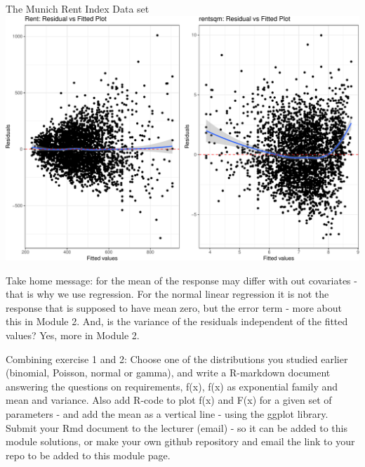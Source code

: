 \documentclass[
  ignorenonframetext,
]{beamer}
\begin{document}
\begin{frame}[fragile]
\begin{block}{The Munich Rent Index Data set}
\includegraphics{Module01IntroPresentation_files/figure-beamer/unnamed-chunk-7-1.pdf}

Take home message: for the mean of the response may differ with out
covariates - that is why we use regression. For the normal linear
regression it is not the response that is supposed to have mean zero,
but the error term - more about this in Module 2. And, is the variance
of the residuals independent of the fitted values? Yes, more in Module
2.
\end{block}
\end{frame}

\begin{frame}
\begin{block}{Combining exercise 1 and 2:}
\protect\hypertarget{combining-exercise-1-and-2}{}
Choose one of the distributions you studied earlier (binomial, Poisson,
normal or gamma), and write a R-markdown document answering the
questions on requirements, f(x), f(x) as exponential family and mean and
variance. Also add R-code to plot f(x) and F(x) for a given set of
parameters - and add the mean as a vertical line - using the ggplot
library. Submit your Rmd document to the lecturer (email) - so it can be
added to this module solutions, or make your own github repository and
email the link to your repo to be added to this module page.
\end{block}
\end{frame}
\end{document}
